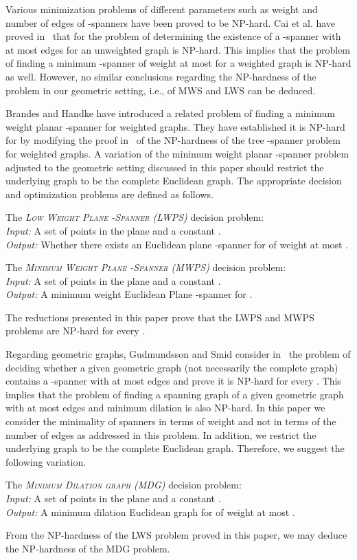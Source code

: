\documentclass[a4paper]{llncs}
\begin{document}
Various minimization problems of different parameters such as weight and number of edges 
of -spanners have been proved to be NP-hard.
Cai et al. have proved in~\cite{Cai94} that for  the problem of determining the existence of 
a -spanner with at most  edges for an unweighted graph is NP-hard.
This implies that the problem of finding a minimum
-spanner of weight at most  for a weighted graph is NP-hard as well.
However, no similar conclusions regarding the NP-hardness of the problem 
in our geometric setting, i.e., of MWS and LWS can be deduced. 

Brandes and Handke have introduced a related problem of finding a minimum weight planar -spanner
for weighted graphs. They have established it is NP-hard for  by modifying the proof in~\cite{CaiC95}
of the NP-hardness of the tree -spanner problem for weighted graphs.
A variation of the minimum weight planar -spanner problem adjusted to the geometric 
setting discussed in this paper should restrict the underlying graph to be the complete Euclidean graph.
The appropriate decision and optimization problems are defined as follows.
\begin{myproblem}\label{prob:LWPS}
The \emph{\textsc{Low Weight Plane -Spanner} (LWPS)} decision problem:\\
\emph{Input:} A set  of points in the plane and a constant .\\
\emph{Output:} Whether there exists an Euclidean plane -spanner for  of weight at most .
\end{myproblem}

\begin{myproblem}\label{prob:MWPS}
The \emph{\textsc{Minimum Weight Plane -Spanner} (MWPS)} decision problem:\\
\emph{Input:} A set  of points in the plane and a constant .\\
\emph{Output:} A minimum weight Euclidean Plane -spanner for .
\end{myproblem}
The reductions presented in this paper prove that the LWPS 
and MWPS problems are NP-hard for every .

Regarding geometric graphs, Gudmundsson and Smid consider in~\cite{GudmundssonS09}
the problem of deciding whether a given geometric graph (not necessarily the complete graph)
contains a -spanner with at most  edges and prove it is NP-hard for every .
This implies that the problem of finding a spanning graph of a given geometric graph
with at most  edges and minimum dilation is also NP-hard.
In this paper we consider the minimality of spanners in terms of weight
and not in terms of the number of edges as addressed in this problem.
In addition, we restrict the underlying graph to be the complete Euclidean graph.
Therefore, we suggest the following variation.
\begin{myproblem}\label{prob:MDG}
The \emph{\textsc{Minimum Dilation graph} (MDG)} decision problem:\\
\emph{Input:} A set  of points in the plane and a constant .\\
\emph{Output:} A minimum dilation Euclidean graph for  of weight at most .
\end{myproblem}
From the NP-hardness of the LWS problem proved in this paper, 
we may deduce the NP-hardness of the MDG problem.
\end{document}
